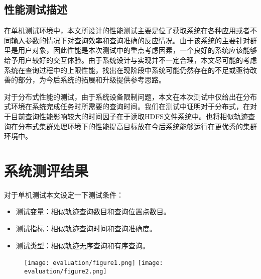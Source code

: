 \subsection{性能测试描述}
\label{subsec:performance test description}
在单机测试环境中，本文所设计的性能测试主要是位了获取系统在各种应用或者不同输入参数的情况下对查询效率和查询准确的反应情况。由于该系统的主要针对群里是用户对象，因此性能是本次测试中的重点考虑因素，一个良好的系统应该能够给予用户较好的交互体验。由于系统设计与实现并不一定合理，本文尽可能的考虑系统在查询过程中的上限性能，找出在现阶段中系统可能仍然存在的不足或亟待改善的部分，为今后系统的拓展和升级提供参考思路。

对于分布式性能的测试，由于系统设备限制问题，本文在本次测试中仅给出在分布式环境在系统完成任务时所需要的查询时间。我们在测试中证明对于分布式，在对于目前查询性能影响较大的时间因子在于读取HDFS文件系统中。也将相似轨迹查询在分布式集群处理环境下的性能提高目标放在今后系统能够运行在更优秀的集群环境中。

\section{系统测评结果}
\label{sec:test result}



对于单机测试本文设定一下测试条件：
\begin{itemize}
	\item 测试变量：相似轨迹查询数目和查询位置点数目。
	\item 测试指标：相似轨迹查询时间和查询准确度。
	\item 测试类型：相似轨迹无序查询和有序查询。
\end{itemize}

\begin{figure}[!htp]
  \centering
  \texttt{[image: evaluation/figure1.png]}
  \hspace{0.5cm}
  \texttt{[image: evaluation/figure2.png]}
\end{figure}

